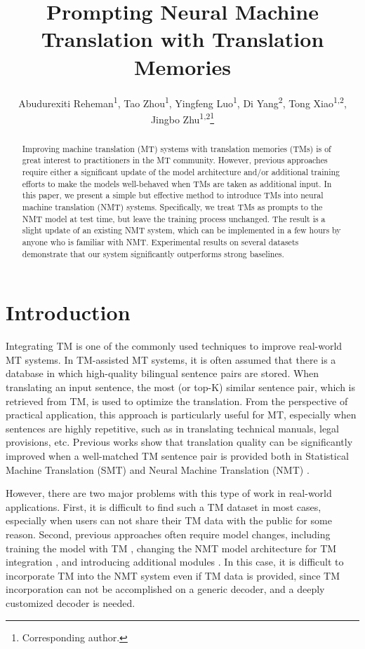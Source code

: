\documentclass[letterpaper]{article} %
\title{Prompting Neural Machine Translation with Translation Memories}
\author{
Abudurexiti Reheman\textsuperscript{\rm 1},
Tao Zhou\textsuperscript{\rm 1},
Yingfeng Luo\textsuperscript{\rm 1},
Di Yang\textsuperscript{\rm 2},
Tong Xiao\textsuperscript{\rm 1,\rm 2},
Jingbo Zhu\textsuperscript{\rm 1,\rm 2}\thanks{Corresponding author.}
}
\begin{document}
\maketitle

\begin{abstract}
Improving machine translation (MT) systems with translation memories (TMs) is of great interest to practitioners in the MT community. However, previous approaches require either a significant update of the model architecture and/or additional training efforts to make the models well-behaved when TMs are taken as additional input. In this paper, we present a simple but effective method to introduce TMs into neural machine translation (NMT) systems. Specifically, we treat TMs as prompts to the NMT model at test time, but leave the training process unchanged. The result is a slight update of an existing NMT system, which can be implemented in a few hours by anyone who is familiar with NMT. Experimental results on several datasets demonstrate that our system significantly outperforms strong baselines.
\end{abstract}


\section{Introduction}

Integrating TM is one of the commonly used techniques to improve real-world MT systems. In TM-assisted MT systems, it is often assumed that there is a database in which high-quality bilingual sentence pairs are stored. When translating an input sentence, the most (or top-K) similar sentence pair, which is retrieved from TM, is used to optimize the translation. From the perspective of practical application, this approach is particularly useful for MT, especially when sentences are highly repetitive, such as in translating technical manuals, legal provisions, etc. Previous works show that translation quality can be significantly improved when a well-matched TM sentence pair is provided both in Statistical Machine Translation (SMT) \cite{ma2011consistent,wang2013integrating,li2014discriminative} and Neural Machine Translation (NMT) \cite{gu2018search,khandelwal2020nearest}.

However, there are two major problems with this type of work in real-world applications. First, it is difficult to find such a TM dataset in most cases, especially when users can not share their TM data with the public for some reason. Second, previous approaches often require model changes, including training the model with TM \cite{bulte2019neural,hossain2020simple,xu2020boosting}, changing the NMT model architecture for TM integration \cite{gu2018search,bapna2019non,xia2019graph,he2021fast}, and introducing additional modules \cite{zhang2018guiding,he2019word,khandelwal2020nearest}. In this case, it is difficult to incorporate TM into the NMT system even if TM data is provided, since TM incorporation can not be accomplished on a generic decoder, and a deeply customized decoder is needed.
\end{document}

